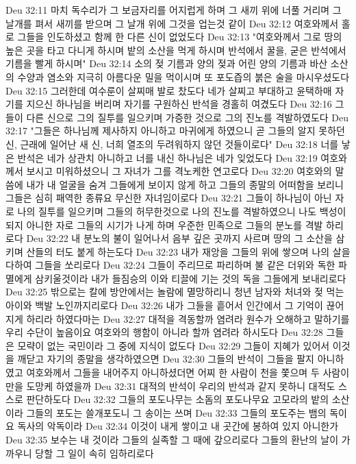 Deu 32:11  마치 독수리가 그 보금자리를 어지럽게 하며 그 새끼 위에 너풀 거리며 그 날개를 펴서 새끼를 받으며 그 날개 위에 그것을 업는것 같이
Deu 32:12  여호와께서 홀로 그들을 인도하셨고 함께 한 다른 신이 없었도다
Deu 32:13  "여호와께서 그로 땅의 높은 곳을 타고 다니게 하시며 밭의 소산을 먹게 하시며 반석에서 꿀을, 굳은 반석에서 기름을 빨게 하시며"
Deu 32:14  소의 젖 기름과 양의 젖과 어린 양의 기름과 바산 소산의 수양과 염소와 지극히 아름다운 밀을 먹이시며 또 포도즙의 붉은 술을 마시우셨도다
Deu 32:15  그러한데 여수룬이 살찌매 발로 찼도다 네가 살찌고 부대하고 윤택하매 자기를 지으신 하나님을 버리며 자기를 구원하신 반석을 경홀히 여겼도다
Deu 32:16  그들이 다른 신으로 그의 질투를 일으키며 가증한 것으로 그의 진노를 격발하였도다
Deu 32:17  "그들은 하나님께 제사하지 아니하고 마귀에게 하였으니 곧 그들의 알지 못하던 신, 근래에 일어난 새 신, 너희 열조의 두려워하지 않던 것들이로다"
Deu 32:18  너를 낳은 반석은 네가 상관치 아니하고 너를 내신 하나님은 네가 잊었도다
Deu 32:19  여호와께서 보시고 미워하셨으니 그 자녀가 그를 격노케한 연고로다
Deu 32:20  여호와의 말씀에 내가 내 얼굴을 숨겨 그들에게 보이지 않게 하고 그들의 종말의 어떠함을 보리니 그들은 심히 패역한 종류요 무신한 자녀임이로다
Deu 32:21  그들이 하나님이 아닌 자로 나의 질투를 일으키며 그들의 허무한것으로 나의 진노를 격발하였으니 나도 백성이 되지 아니한 자로 그들의 시기가 나게 하며 우준한 민족으로 그들의 분노를 격발 하리로다
Deu 32:22  내 분노의 불이 일어나서 음부 깊은 곳까지 사르며 땅의 그 소산을 삼키며 산들의 터도 붙게 하는도다
Deu 32:23  내가 재앙을 그들의 위에 쌓으며 나의 살을 다하여 그들을 쏘리로다
Deu 32:24  그들이 주리므로 파리하며 불 같은 더위와 독한 파멸에게 삼키울것이라 내가 들짐승의 이와 티끌에 기는 것의 독을 그들에게 보내리로다
Deu 32:25  밖으로는 칼에 방안에서는 놀람에 멸망하리니 청년 남자와 처녀와 젖 먹는 아이와 백발 노인까지리로다
Deu 32:26  내가 그들을 흩어서 인간에서 그 기억이 끊어지게 하리라 하였다마는
Deu 32:27  대적을 격동할까 염려라 원수가 오해하고 말하기를 우리 수단이 높음이요 여호와의 행함이 아니라 할까 염려라 하시도다
Deu 32:28  그들은 모략이 없는 국민이라 그 중에 지식이 없도다
Deu 32:29  그들이 지혜가 있어서 이것을 깨닫고 자기의 종말을 생각하였으면
Deu 32:30  그들의 반석이 그들을 팔지 아니하였고 여호와께서 그들을 내어주지 아니하셨더면 어찌 한 사람이 천을 쫓으며 두 사람이 만을 도망케 하였을까
Deu 32:31  대적의 반석이 우리의 반석과 같지 못하니 대적도 스스로 판단하도다
Deu 32:32  그들의 포도나무는 소돔의 포도나무요 고모라의 밭의 소산이라 그들의 포도는 쓸개포도니 그 송이는 쓰며
Deu 32:33  그들의 포도주는 뱀의 독이요 독사의 악독이라
Deu 32:34  이것이 내게 쌓이고 내 곳간에 봉하여 있지 아니한가
Deu 32:35  보수는 내 것이라 그들의 실족할 그 때에 갚으리로다 그들의 환난의 날이 가까우니 당할 그 일이 속히 임하리로다
